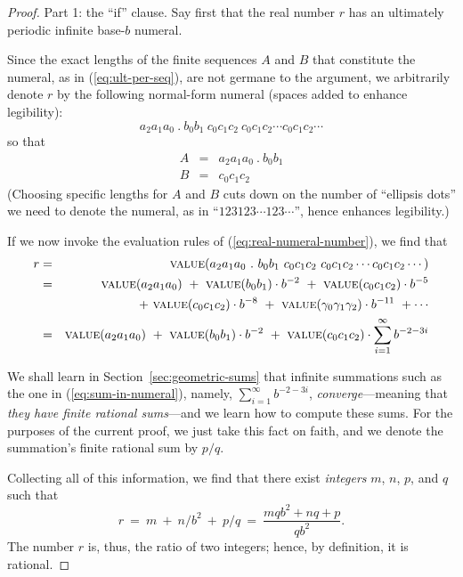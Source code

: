 \begin{proof}
{\small\sf Part 1: the ``if'' clause.}
Say first that the real number $r$ has an ultimately periodic infinite
base-$b$ numeral.

Since the exact lengths of the finite sequences $A$ and $B$ that
constitute the numeral, as in (\ref{eq:ult-per-seq}), are not germane
to the argument, we arbitrarily denote $r$ by the following
normal-form numeral (spaces added to enhance legibility):
\[  a_2 a_1 a_0 \ . \ b_0 b_1 \
c_0 c_1 c_2 \
c_0 c_1 c_2
\cdots
c_0 c_1 c_2
\cdots
\]
so that
\begin{eqnarray*}
A & = & a_2 a_1 a_0 \ . \ b_0 b_1 \\
B & = & c_0 c_1 c_2
\end{eqnarray*}
(Choosing specific lengths for $A$ and $B$ cuts down on the number of
``ellipsis dots'' we need to denote the numeral, as in ``$123 123
\cdots 123 \cdots$'', hence enhances legibility.)

If we now invoke the evaluation rules of (\ref{eq:real-numeral-number}),
we find that
\begin{eqnarray}
\nonumber
r & = &
\mbox{\sc value}(a_2 a_1 a_0 \ . \ b_0 b_1 \
c_0 c_1 c_2 \
c_0 c_1 c_2
\cdots
c_0 c_1 c_2
\cdots) \\
\nonumber
  & = &
\mbox{\sc value}(a_2 a_1 a_0)
 \ + \ \mbox{\sc value}(b_0 b_1) \cdot b^{-2}
 \ + \
\mbox{\sc value}(c_0 c_1 c_2) \cdot b^{-5} \\
\label{eq:sum-in-numeral}
  &  &
 \ + \
\mbox{\sc value}(c_0 c_1 c_2) \cdot b^{-8}
 \ + \
\mbox{\sc value}(\gamma_0 \gamma_1 \gamma_2) \cdot b^{-11}
\ + \cdots \\
\nonumber
  & = &
\mbox{\sc value}(a_2 a_1 a_0)
 \ + \ \mbox{\sc value}(b_0 b_1) \cdot b^{-2}
 \ + \
\mbox{\sc value}(c_0 c_1 c_2) \cdot \sum_{i=1}^\infty b^{-2-3i}
\end{eqnarray}

We shall learn in Section~\ref{sec:geometric-sums} that infinite
summations such as the one in (\ref{eq:sum-in-numeral}), namely,
$\sum_{i=1}^\infty b^{-2-3i}$,
{\em converge}---meaning that {\em they have finite rational
  sums}---and we learn how to compute these sums.  For the purposes of
the current proof, we just take this fact on faith, and we denote the
summation's finite rational sum by $p/q$.

Collecting all of this information, we find that there exist {\em
  integers} $m$, $n$, $p$, and $q$ such that
\[ r \ = \ m \ + \ n/ b^{2} \ + \ p/q \ = \
\frac{mqb^2 + nq + p}{qb^2}. \]
The number $r$ is, thus, the ratio of two integers; hence, by
definition, it is rational.


\end{proof}
